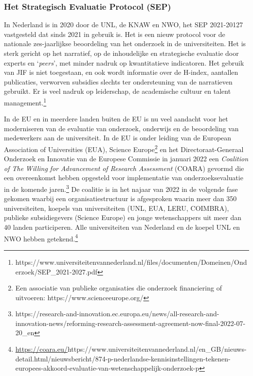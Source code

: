 \documentclass[smallauthor, chapterhaspagenum, nochapterinheader, pagenuminheader,  bigchapnum,medium2, tocpages,  garamond, titleinheader]{jote-book}
\begin{document}
	\subsubsection{Het Strategisch Evaluatie Protocol (SEP)}



	In Nederland is in 2020 door de UNL, de KNAW en NWO, het SEP 2021-20127 vastgesteld dat sinds 2021 in gebruik is. Het is een nieuw protocol voor de nationale zes-jaarlijkse beoordeling van het onderzoek in de universiteiten. Het is sterk gericht op het narratief, op de inhoudelijke en strategische evaluatie door experts en ‘\emph{peers}', met minder nadruk op kwantitatieve indicatoren. Het gebruik van JIF is niet toegestaan, en ook wordt informatie over de H-index, aantallen publicaties, verworven subsidies slechts ter ondersteuning van de narratieven gebruikt. Er is veel nadruk op leiderschap, de academische cultuur en talent management.\footnote{https://www.universiteitenvannederland.nl/files/documenten/Domeinen/Onderzoek/SEP\_2021-2027.pdf}



	In de EU en in meerdere landen buiten de EU is nu veel aandacht voor het moderniseren van de evaluatie van onderzoek, onderwijs en de beoordeling van medewerkers aan de universiteit. In de EU is onder leiding van de European Association of Universities (EUA), Science Europe\footnote{Een associatie van publieke organisaties die onderzoek financiering of uitvoeren: https://www.scienceeurope.org/} en het Directoraat-Generaal Onderzoek en Innovatie van de Europese Commissie in januari 2022 een \emph{Coalition}\emph{ of The }\emph{Willing}\emph{ }\emph{for}\emph{ }\emph{Advancement}\emph{ of Research Assessment}\emph{ }(COARA) gevormd die een overeenkomst hebben opgesteld voor implementatie van onderzoeksevaluatie in de komende jaren.\footnote{https://research-and-innovation.ec.europa.eu/news/all-research-and-innovation-news/reforming-research-assessment-agreement-now-final-2022-07-20\_en} De coalitie is in het najaar van 2022 in de volgende fase gekomen waarbij een organisatiestructuur is afgesproken waarin meer dan 350 universiteiten, koepels van universiteiten (UNL, EUA, LERU, COIMBRA), publieke subsidiegevers (Science Europe) en jonge wetenschappers uit meer dan 40 landen participeren. Alle universiteiten van Nederland en de koepel UNL en NWO hebben getekend.\footnote{\href{https://coara.eu/}{https://coara.eu/}https://www.universiteitenvannederland.nl/en\_GB/nieuws-detail.html/nieuwsbericht/874-p-nederlandse-kennisinstellingen-tekenen-europees-akkoord-evaluatie-van-wetenschappelijk-onderzoek-p}
\end{document}
